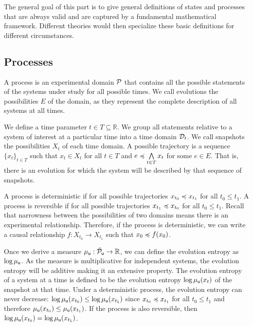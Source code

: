 \documentclass[11pt,letterpaper,fleqn]{memoir} %
\begin{document}
The general goal of this part is to give general definitions of states and processes that are always valid and are captured by a fundamental mathematical framework. Different theories would then specialize these basic definitions for different circumstances.

\subsection{Processes}

A process is an experimental domain $\edomain[P]$ that contains all the possible statements of the systems under study for all possible times. We call evolutions the possibilities $E$ of the domain, as they represent the complete description of all systems at all times.

We define a time parameter $t \in T \subseteq \mathbb{R}$. We group all statements relative to a system of interest at a particular time into a time domain $\edomain_t$. We call snapshots the possibilities $X_t$ of each time domain. A possible trajectory is a sequence $\{x_t\}_{t \in T}$ such that $x_t \in X_t$ for all $t \in T$ and $e \narrower \bigAND\limits_{t \in T} x_t$ for some $e \in E$. That is, there is an evolution for which the system will be described by that sequence of snapshots.

A process is deterministic if for all possible trajectories $x_{t_0} \narrower x_{t_1}$ for all $t_0 \leq t_1$. A process is reversible if for all possible trajectories $x_{t_1} \narrower x_{t_0}$ for all $t_0 \leq t_1$. Recall that narrowness between the possibilities of two domains means there is an experimental relationship. Therefore, if the process is deterministic, we can write a causal relationship $f : X_{t_0} \to X_{t_1}$ such that $x_0 \narrower f(x_0)$.

Once we derive a measure $\mu_{\stmt[u]} : \tdomain[P]_{\stmt[u]} \to \mathbb{R}$, we can define the evolution entropy as $\log \mu_{\stmt[u]}$. As the measure is multiplicative for independent systems, the evolution entropy will be additive making it an extensive property. The evolution entropy of a system at a time is defined to be the evolution entropy $\log \mu_{\stmt[u]}(x_t)$ of the snapshot at that time. Under a deterministic process, the evolution entropy can never decrease: $\log \mu_{\stmt[u]}(x_{t_0}) \leq \log \mu_{\stmt[u]}(x_{t_1})$ since $x_{t_0} \narrower x_{t_1}$ for all $t_0 \leq t_1$ and therefore $\mu_{\stmt[u]}(x_{t_0}) \leq \mu_{\stmt[u]}(x_{t_1})$. If the process is also reversible, then $\log \mu_{\stmt[u]}(x_{t_0}) = \log \mu_{\stmt[u]}(x_{t_1})$.
\end{document}
